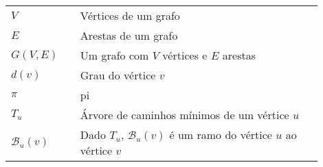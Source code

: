

\begin{listasimb}

\begin{longtable}[l]{p{0.2\linewidth}p{0.7\linewidth}}
	$V$					& Vértices de um grafo \\
	$E$					& Arestas de um grafo \\
	$G(V, E)$			& Um grafo com $V$ vértices e $E$ arestas \\
	$d(v)$ 				& Grau do vértice $v$ \\
	$\pi$ 				& pi \\
	$T_u$ 				& Árvore de caminhos mínimos de um vértice $u$ \\
	$\mathcal{B}_u(v)$	& Dado $T_u$, $\mathcal{B}_u(v)$ é um ramo do vértice $u$ ao vértice $v$ \\
\end{longtable}

\end{listasimb}

